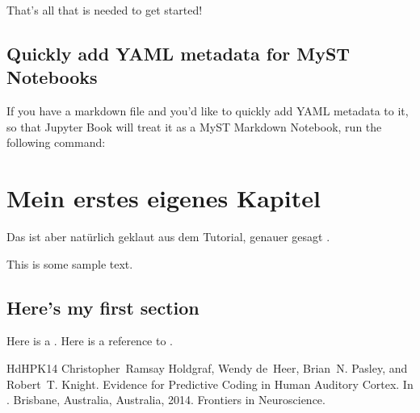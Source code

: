 \documentclass[letterpaper,10pt,english]{jupyterBook}
\begin{document}
\sphinxAtStartPar
That’s all that is needed to get started!


\section{Quickly add YAML metadata for MyST Notebooks}
\label{\detokenize{markdown-notebooks:quickly-add-yaml-metadata-for-myst-notebooks}}
\sphinxAtStartPar
If you have a markdown file and you’d like to quickly add YAML metadata to it, so that Jupyter Book will treat it as a MyST Markdown Notebook, run the following command:

\begin{sphinxVerbatim}[commandchars=\\\{\}]
   
\end{sphinxVerbatim}

\sphinxstepscope


\chapter{Mein erstes eigenes Kapitel}
\label{\detokenize{neue-markdown-datei:mein-erstes-eigenes-kapitel}}\label{\detokenize{neue-markdown-datei::doc}}
\sphinxAtStartPar
Das ist aber natürlich geklaut aus dem Tutorial, genauer gesagt .

\sphinxAtStartPar
This is some sample text.


\section{Here’s my first section}
\label{\detokenize{neue-markdown-datei:here-s-my-first-section}}\label{\detokenize{neue-markdown-datei:section-label}}
\sphinxAtStartPar
Here is a {\hyperref[\detokenize{intro::doc}]{}}. Here is a reference to {\hyperref[\detokenize{neue-markdown-datei:section-label}]{}}.

\begin{sphinxthebibliography}{HdHPK14}
\sphinxAtStartPar
Christopher Ramsay Holdgraf, Wendy de Heer, Brian N. Pasley, and Robert T. Knight. Evidence for Predictive Coding in Human Auditory Cortex. In . Brisbane, Australia, Australia, 2014. Frontiers in Neuroscience.
\end{sphinxthebibliography}







\renewcommand{\indexname}{Index}
\printindex
\end{document}
